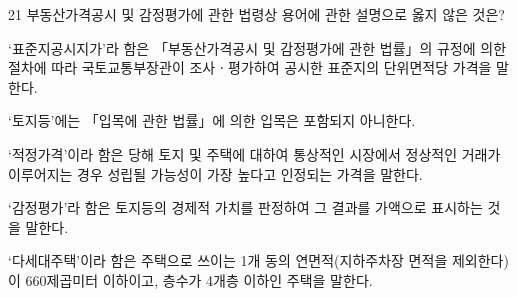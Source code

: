 \begin{question}{21}
부동산가격공시 및 감정평가에 관한 법령상 용어에 관한 설명으로 옳지 않은 것은?
\begin{choices}
  \item ‘표준지공시지가’라 함은 「부동산가격공시 및 감정평가에 관한 법률」의 규정에 의한 절차에 따라 국토교통부장관이 조사ㆍ평가하여 공시한 표준지의 단위면적당 가격을 말한다.
  \item ‘토지등’에는 「입목에 관한 법률」에 의한 입목은 포함되지 아니한다.
  \item ‘적정가격’이라 함은 당해 토지 및 주택에 대하여 통상적인 시장에서 정상적인 거래가 이루어지는 경우 성립될 가능성이 가장 높다고 인정되는 가격을 말한다.
  \item ‘감정평가’라 함은 토지등의 경제적 가치를 판정하여 그 결과를 가액으로 표시하는 것을 말한다.
  \item ‘다세대주택’이라 함은 주택으로 쓰이는 1개 동의 연면적(지하주차장 면적을 제외한다)이 660제곱미터 이하이고, 층수가 4개층 이하인 주택을 말한다.
\end{choices}
\end{question}
